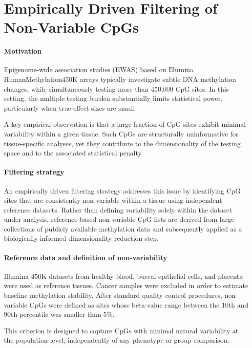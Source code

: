 \documentclass[10pt]{extarticle}
\begin{document}
\section{Empirically Driven Filtering of Non-Variable CpGs}

\paragraph{Motivation}
Epigenome-wide association studies (EWAS) based on Illumina HumanMethylation450K arrays typically investigate subtle DNA methylation changes, while simultaneously testing more than 450,000 CpG sites. In this setting, the multiple testing burden substantially limits statistical power, particularly when true effect sizes are small.

A key empirical observation is that a large fraction of CpG sites exhibit minimal variability within a given tissue. Such CpGs are structurally uninformative for tissue-specific analyses, yet they contribute to the dimensionality of the testing space and to the associated statistical penalty.

\paragraph{Filtering strategy}
An empirically driven filtering strategy addresses this issue by identifying CpG sites that are consistently non-variable within a tissue using independent reference datasets. Rather than defining variability solely within the dataset under analysis, reference-based non-variable CpG lists are derived from large collections of publicly available methylation data and subsequently applied as a biologically informed dimensionality reduction step.

\paragraph{Reference data and definition of non-variability}
Illumina 450K datasets from healthy blood, buccal epithelial cells, and placenta were used as reference tissues. Cancer samples were excluded in order to estimate baseline methylation stability. After standard quality control procedures, non-variable CpGs were defined as sites whose beta-value range between the 10th and 90th percentile was smaller than 5\%.

This criterion is designed to capture CpGs with minimal natural variability at the population level, independently of any phenotype or group comparison.
\end{document}

